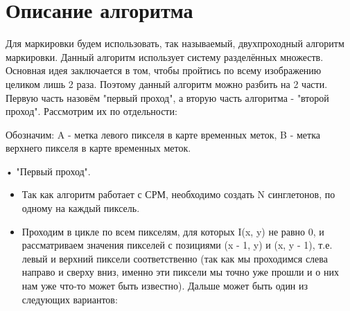 \documentclass{report}
\begin{document}
\section*{Описание алгоритма}
\par Для маркировки будем использовать, так
называемый, двухпроходный алгоритм маркировки. Данный алгоритм использует систему разделённых множеств. Основная идея заключается в том, чтобы пройтись по всему изображению целиком лишь 2 раза. Поэтому данный алгоритм можно разбить на 2 части. Первую часть назовём "первый проход", а вторую часть алгоритма -
"второй проход". Рассмотрим их по отдельности:
\par Обозначим: A - метка левого пикселя в карте временных меток,
B - метка верхнего пикселя в карте временных меток.
\par • "Первый проход".
\begin{itemize}
\item Так как алгоритм работает с СРМ, необходимо создать N синглетонов,
по одному на каждый пиксель.
\item Проходим в цикле по всем пикселям, для которых I(x, y) не равно 0, и
рассматриваем значения пикселей с позициями (x - 1, y) и (x, y - 1), т.е.
левый и верхний пиксели соответственно (так как мы проходимся слева
направо и сверху вниз, именно эти пиксели мы точно уже прошли и о
них нам уже что-то может быть известно). Дальше может быть один из
следующих вариантов:
\end{itemize}
\end{document}
